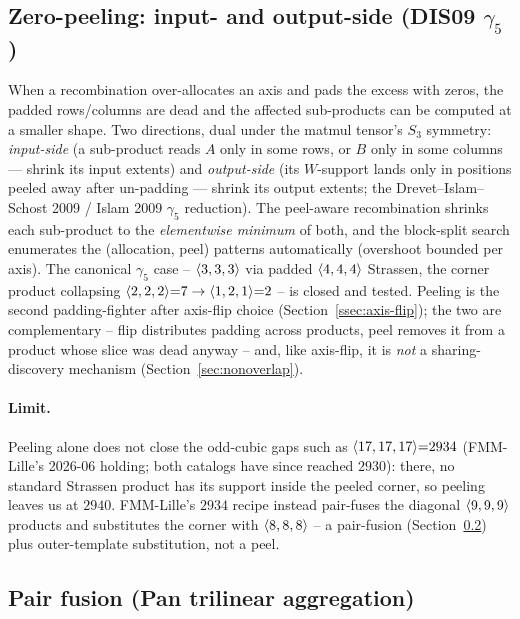 \subsection{Zero-peeling: input- and output-side (DIS09 \(\gamma_5\))}
\label{ssec:peel}

When a recombination over-allocates an axis and pads the excess with zeros, the padded
rows/columns are dead and the affected sub-products can be computed at a smaller shape.
Two directions, dual under the matmul tensor's \(S_3\) symmetry: \emph{input-side} (a
sub-product reads \(A\) only in some rows, or \(B\) only in some columns --- shrink its
input extents) and \emph{output-side} (its \(W\)-support lands only in positions peeled
away after un-padding --- shrink its output extents; the Drevet--Islam--Schost 2009 /
Islam 2009 \(\gamma_5\) reduction). The peel-aware recombination shrinks each sub-product
to the \emph{elementwise minimum} of both, and the block-split search enumerates the
(allocation, peel) patterns automatically (overshoot bounded per axis). The canonical
\(\gamma_5\) case -- \(\langle 3, 3, 3 \rangle\) via padded \(\langle 4, 4, 4 \rangle\) Strassen, the
corner product collapsing \(\langle 2, 2, 2 \rangle{=}7 \to \langle 1, 2, 1 \rangle{=}2\) -- is
closed and tested. Peeling is the second padding-fighter after axis-flip choice
(Section~\ref{ssec:axis-flip}); the two are complementary -- flip distributes padding
across products, peel removes it from a product whose slice was dead anyway -- and, like
axis-flip, it is \emph{not} a sharing-discovery mechanism (Section~\ref{sec:nonoverlap}).

\paragraph{Limit.} Peeling alone does not close the odd-cubic gaps such as
\(\langle 17, 17, 17 \rangle{=}2934\) (FMM-Lille's 2026-06 holding; both catalogs have since
reached \(2930\)): there, no standard Strassen product has its support inside the peeled
corner, so peeling leaves us at \(2940\). FMM-Lille's \(2934\) recipe instead pair-fuses
the diagonal \(\langle 9, 9, 9 \rangle\) products and substitutes the corner with
\(\langle 8, 8, 8 \rangle\) -- a pair-fusion (Section~\ref{ssec:pair-fusion}) plus
outer-template substitution, not a peel.

\subsection{Pair fusion (Pan trilinear aggregation)}
\label{ssec:pair-fusion}

